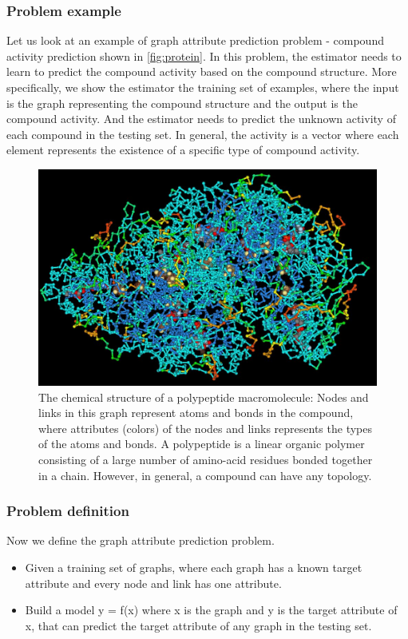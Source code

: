 \documentclass{article}
\begin{document}
\subsubsection{Problem example}
Let us look at an example of graph attribute prediction problem - compound activity prediction shown in \autoref{fig:protein}.
In this problem, the estimator needs to learn to predict the compound activity
based on the compound structure.
More specifically, we show the estimator the training set of examples,
where the input is the graph representing the compound structure and
the output is the compound activity.
And the estimator needs to predict the unknown activity of each compound
in the testing set.
In general, the activity is a vector where each element represents
the existence of a specific type of compound activity.
\begin{figure}[!htb]\centering
	\includegraphics[width=\textwidth]{ProteinStructure}
	\caption{
		The chemical structure of a polypeptide macromolecule:
		Nodes and links in this graph represent atoms and bonds in the compound,
		where attributes (colors) of the nodes and links represents
		the types of the atoms and bonds.
		A polypeptide is a linear organic polymer consisting of a large number of amino-acid residues bonded together in a chain.
		However, in general, a compound can have any topology.
	}
	\label{fig:protein}
\end{figure}

\subsubsection{Problem definition}
Now we define the graph attribute prediction problem.
\begin{itemize}
	\item Given a training set of graphs, where each graph has a known target attribute and every node and link has one attribute.
	\item Build a model y = f(x) where x is the graph and y is the target attribute of x,
	that can predict the target attribute of any graph in the testing set.
\end{itemize}
\end{document}
